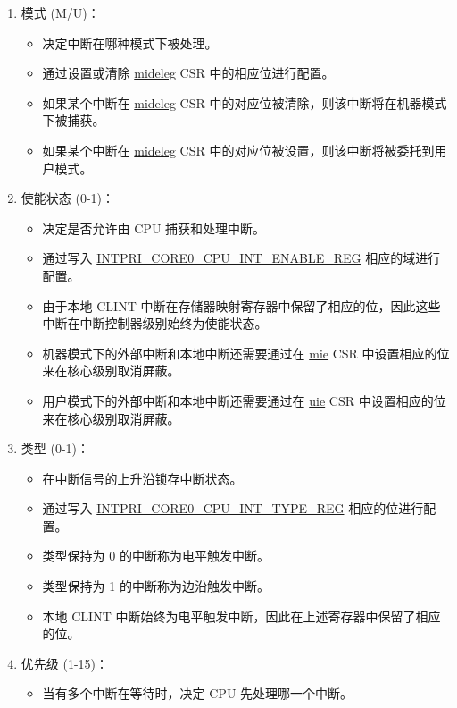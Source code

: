 \documentclass[main\_\_CN.tex]{subfiles}
\begin{document}
\begin{enumerate}
    \item 模式 (M/U)：
    \begin{itemize}
        \item 决定中断在哪种模式下被处理。
        \item 通过设置或清除 \hyperref[regdesc:MIDELEG]{mideleg} CSR 中的相应位进行配置。
        \item 如果某个中断在 \hyperref[regdesc:MIDELEG]{mideleg} CSR 中的对应位被清除，则该中断将在机器模式下被捕获。
        \item 如果某个中断在 \hyperref[regdesc:MIDELEG]{mideleg} CSR 中的对应位被设置，则该中断将被委托到用户模式。
    \end{itemize}
    \item 使能状态 (0-1)：
    \begin{itemize}
        \item 决定是否允许由 CPU 捕获和处理中断。
        \item 通过写入 \hyperref[regdesc:INTPRICORE0CPUINTENABLEREG]{INTPRI\_CORE0\_CPU\_INT\_ENABLE\_REG} 相应的域进行配置。
        \item 由于本地 CLINT 中断在存储器映射寄存器中保留了相应的位，因此这些中断在中断控制器级别始终为使能状态。
        \item 机器模式下的外部中断和本地中断还需要通过在 \hyperref[regdesc:MIE]{mie} CSR 中设置相应的位来在核心级别取消屏蔽。
        \item 用户模式下的外部中断和本地中断还需要通过在 \hyperref[regdesc:UIE]{uie} CSR 中设置相应的位来在核心级别取消屏蔽。
    \end{itemize}
    \item 类型 (0-1)：
    \begin{itemize}
        \item 在中断信号的上升沿锁存中断状态。
        \item 通过写入 \hyperref[regdesc:INTPRICORE0CPUINTTYPEREG]{INTPRI\_CORE0\_CPU\_INT\_TYPE\_REG} 相应的位进行配置。
        \item 类型保持为 0 的中断称为电平触发中断。
        \item 类型保持为 1 的中断称为边沿触发中断。
        \item 本地 CLINT 中断始终为电平触发中断，因此在上述寄存器中保留了相应的位。
    \end{itemize}
    \item 优先级 (1-15)：
    \begin{itemize}
        \item 当有多个中断在等待时，决定 CPU 先处理哪一个中断。

\end{itemize}
\end{enumerate}
\end{document}
